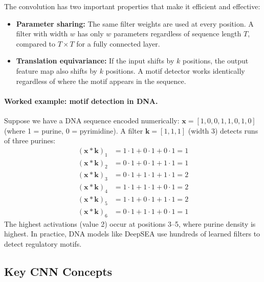 The convolution has two important properties that make it efficient and effective:
\begin{itemize}[leftmargin=1.5em]
  \item \textbf{Parameter sharing:} The same filter weights are used at every position. A filter with width $w$ has only $w$ parameters regardless of sequence length $T$, compared to $T \times T$ for a fully connected layer.
  \item \textbf{Translation equivariance:} If the input shifts by $k$ positions, the output feature map also shifts by $k$ positions. A motif detector works identically regardless of where the motif appears in the sequence.
\end{itemize}

\paragraph{Worked example: motif detection in DNA.} Suppose we have a DNA sequence encoded numerically: $\mathbf{x} = [1, 0, 0, 1, 1, 0, 1, 0]$ (where 1 = purine, 0 = pyrimidine). A filter $\mathbf{k} = [1, 1, 1]$ (width 3) detects runs of three purines:
\begin{align}
(\mathbf{x} * \mathbf{k})_1 &= 1 \cdot 1 + 0 \cdot 1 + 0 \cdot 1 = 1 \\
(\mathbf{x} * \mathbf{k})_2 &= 0 \cdot 1 + 0 \cdot 1 + 1 \cdot 1 = 1 \\
(\mathbf{x} * \mathbf{k})_3 &= 0 \cdot 1 + 1 \cdot 1 + 1 \cdot 1 = 2 \\
(\mathbf{x} * \mathbf{k})_4 &= 1 \cdot 1 + 1 \cdot 1 + 0 \cdot 1 = 2 \\
(\mathbf{x} * \mathbf{k})_5 &= 1 \cdot 1 + 0 \cdot 1 + 1 \cdot 1 = 2 \\
(\mathbf{x} * \mathbf{k})_6 &= 0 \cdot 1 + 1 \cdot 1 + 0 \cdot 1 = 1
\end{align}
The highest activations (value 2) occur at positions 3--5, where purine density is highest. In practice, DNA models like DeepSEA \citep{zhou2015} use hundreds of learned filters to detect regulatory motifs.

\subsection{Key CNN Concepts}

